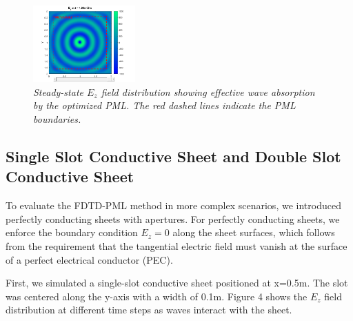 \documentclass[journal]{IEEEtran}
\begin{document}
\begin{figure}[htbp]
    \centering
    \includegraphics[width=0.35\textwidth]{figure/3.png}
    \caption{\small\textit{Steady-state $E_z$ field distribution showing effective wave absorption by the optimized PML. The red dashed lines indicate the PML boundaries.}}
    \label{fig:pml_effectiveness}
\end{figure}

\subsection{Single Slot Conductive Sheet and Double Slot Conductive Sheet}
To evaluate the FDTD-PML method in more complex scenarios, we introduced perfectly conducting sheets with apertures. 
For perfectly conducting sheets, we enforce the boundary condition $E_z = 0$ along the sheet surfaces, 
which follows from the requirement that the tangential electric field must vanish at the surface of a perfect electrical conductor (PEC).  

First, we simulated a single-slot conductive sheet positioned at x=0.5m. The slot was centered along the y-axis with a width of 0.1m. Figure 4 shows the $E_z$ field distribution at different time steps as waves interact with the sheet.
\end{document}
